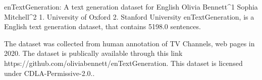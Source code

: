 
enTextGeneration: A text generation dataset for English
Olivia Bennett^1 Sophia Mitchell^2
1. University of Oxford 2. Stanford University
enTextGeneration, is a English text generation dataset, that contains 5198.0 sentences.

The dataset was collected from human annotation of TV Channels, web pages in 2020. 
The dataset is publically available through this link https://github.com/oliviabennett/enTextGeneration. This dataset is licensed under CDLA-Permissive-2.0..

